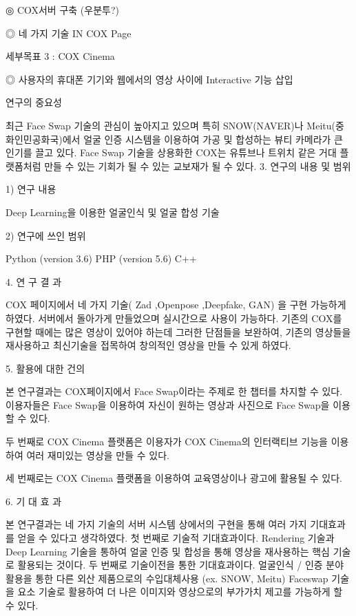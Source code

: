 \documentclass{oblivoir}
\begin{document}
◎ COX서버 구축 (우분투?)

◎ 네 가지 기술 IN COX Page

 세부목표 3 : COX Cinema 

◎ 사용자의 휴대폰 기기와 웹에서의 영상 사이에 Interactive 기능 삽입

 연구의 중요성

  최근 Face Swap 기술의 관심이 높아지고 있으며 특히 SNOW(NAVER)나 Meitu(중화인민공화국)에서 얼굴 인증 시스템을 이용하여 가공 및 합성하는 뷰티 카메라가 큰 인기를 끌고 있다. Face Swap 기술을 상용화한 COX는 유튜브나 트위치 같은 거대 플랫폼처럼 만들 수 있는 기회가 될 수 있는 교보재가 될 수 있다.
  3. 연구의 내용 및 범위

  1) 연구 
  내용
  
  Deep Learning을 이용한 얼굴인식 및 얼굴 합성 기술
  
  2) 연구에 쓰인 범위
  
  Python (version 3.6) 
  PHP (version 5.6) 
  C++
  
  4. 연  구  결  과
  
   COX 페이지에서 네 가지 기술( Zad ,Openpose ,Deepfake, GAN) 을 구현 가능하게 하였다. 서버에서 돌아가게 만들었으며 실시간으로 사용이 가능하다. 기존의 COX를 구현할 때에는 많은 영상이 있어야 하는데 그러한 단점들을 보완하여, 기존의 영상들을 재사용하고 최신기술을 접목하여 창의적인 영상을 만들 수 있게 하였다.
  
  
  5. 활용에 대한 건의
  
  본 연구결과는 COX페이지에서 Face Swap이라는 주제로 한 챕터를 차지할 수 있다. 이용자들은 Face Swap을 이용하여 자신이 원하는 영상과 사진으로 Face Swap을 이용할 수 있다.
  
  두 번째로 COX Cinema 플랫폼은 이용자가 COX Cinema의 인터랙티브 기능을 이용하여 여러 재미있는 영상을 만들 수 있다. 
  
  세 번째로는 COX Cinema 플랫폼을 이용하여 교육영상이나 광고에 활용될 수 있다.
  
  
  6. 기  대  효  과
  
  본 연구결과는 네 가지 기술의 서버 시스템 상에서의 구현을 통해 여러 가지 기대효과를 얻을 수 있다고 생각하였다. 첫 번째로 기술적 기대효과이다. Rendering 기술과 Deep Learning 기술을 통하여 얼굴 인증 및 합성을 통해 영상을 재사용하는 핵심 기술로 활용되는 것이다.
  두 번째로 기술이전을 통한 기대효과이다. 얼굴인식 / 인증 분야 활용을 통한 다른 외산 제품으로의 수입대체사용 (ex. SNOW, Meitu) Faceswap 기술을 요소 기술로 활용하여 더 나은 이미지와 영상으로의 부가가치 제고를 가능하게 할 수 있다.
  
\end{document}
